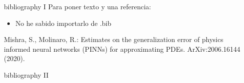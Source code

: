 \begin{frame}{bibliography I}
Para poner texto y una referencia:
\begin{itemize}
\item No he sabido importarlo de .bib
\end{itemize}
\vspace{0.5cm}

\begin{thebibliography}{1}
Mishra, S., Molinaro, R.: Estimates on the generalization error of physics informed neural
networks (PINNs) for approximating PDEs. ArXiv:2006.16144 (2020).
\end{thebibliography}

\end{frame}
\begin{frame}{bibliography II}

{\small }
\textcolor{white}{\tiny
\cite{ritz}
\cite{pinn}
\cite{dgm}
\cite{hp_vpinn}
\cite{Mishra}
}

\end{frame}

